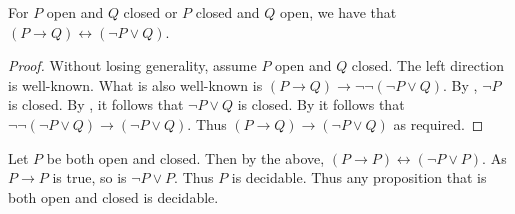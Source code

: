 \documentclass{../util/zariski-small}
\begin{document}
\begin{lemma}\label{OpenClosedImplication}
  For $P$ open and $Q$ closed or $P$ closed and $Q$ open, we have that $(P\to Q) \leftrightarrow (\neg P \vee Q)$. 
\end{lemma}
\begin{proof}
  Without losing generality, assume $P$ open and $Q$ closed. 
  The left direction is well-known. 
  What is also well-known is 
  $(P \to Q) \to \neg \neg (\neg P \vee Q)$.
  By , $\neg P$ is closed. 
  By , it follows that $\neg P \vee Q$ is closed. 
  By  it follows that $\neg \neg (\neg P \vee Q) \to (\neg P \vee Q)$. 
  Thus $(P \to Q) \to (\neg P \vee Q)$ as required. 
\end{proof}
\begin{corollary}\label{OpenAndClosedMeansDecidable}
  Let $P$ be both open and closed. 
  Then by the above, $(P\to P)\leftrightarrow (\neg P \vee P)$. 
  As $P\to P$ is true, so is $\neg P \vee P$. Thus $P$ is decidable. 
  Thus any proposition that is both open and closed is decidable. 
\end{corollary}
\end{document}
